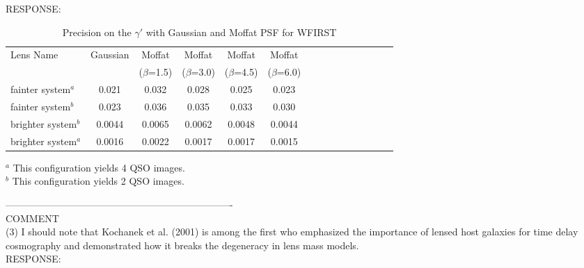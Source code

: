 \documentclass[a4paper,11pt]{article}
\begin{document}
RESPONSE:
\\
\begin{table*}\footnotesize
\begin{center}
\caption{Precision on the $\gamma'$ with Gaussian and Moffat PSF for WFIRST}
\begin{tabular}{lcccccccccccccc|}
\hline \hline
Lens Name & Gaussian & Moffat & Moffat & Moffat & Moffat
\\
& & ($\beta$=1.5) & ($\beta$=3.0) & ($\beta$=4.5) & ($\beta$=6.0) \\
\hline
fainter system$^a$ & 0.021 & 0.032 & 0.028 & 0.025 & 0.023 \\
fainter system$^b$ & 0.023 & 0.036 & 0.035 & 0.033 & 0.030 \\
brighter system$^b$ & 0.0044 & 0.0065 & 0.0062 & 0.0048 & 0.0044 \\
brighter system$^a$ & 0.0016 & 0.0022 & 0.0017 & 0.0017 & 0.0015 \\
\hline
\hline
\end{tabular}
\begin{tablenotes}
\item
$^a$ This configuration yields 4 QSO images. \\
$^b$ This configuration yields 2 QSO images. \\
\end{tablenotes}
\end{center}
\end{table*}

----------------------------------------------------------------------
\\
COMMENT
\\
(3) I should note that Kochanek et al. (2001) is among the first who emphasized the importance of lensed host galaxies for time delay cosmography and demonstrated how it breaks the degeneracy in lens mass models.
\\

RESPONSE:
\\ 
\end{document}
